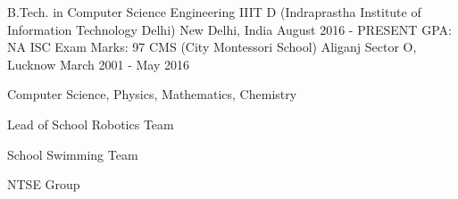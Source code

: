 \begin{cventries}
  \cventry
    {B.Tech. in Computer Science Engineering}
    {IIIT D (Indraprastha Institute of Information Technology Delhi)}
    {New Delhi, India}
    {August 2016 - PRESENT}
    {GPA: NA}
  \cventry
    {ISC Exam Marks: 97}
    {CMS (City Montessori School)}
    {Aliganj Sector O, Lucknow}
    {March 2001 - May 2016}
    {
      \begin{cvitems}
        \item {Computer Science, Physics, Mathematics, Chemistry}
        \item {Lead of School Robotics Team}
        \item {School Swimming Team}
        \item {NTSE Group}
      \end{cvitems}
    }
\end{cventries}

